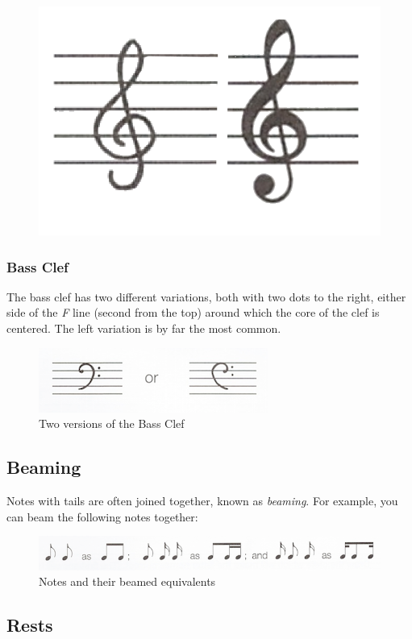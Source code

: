 \begin{figure}[h!]
  \includegraphics[width=0.3\linewidth]{gfx/basic/treble-clef.png}
  \centering
  \label{fig:TrebleClef}
\end{figure}

\subsubsection{Bass Clef}

The bass clef has two different variations, both with two dots to the right, either side of the \emph{F} line (second from the top) around which the core of the clef is centered. The left variation is by far the most common.

\begin{figure}[h!]
  \includegraphics[width=0.5\linewidth]{gfx/basic/bass-clef.png}
  \centering
  \caption{Two versions of the Bass Clef}
  \label{fig:BassClef}
\end{figure}

\subsection{Beaming}

Notes with tails are often joined together, known as \emph{beaming}. For example, you can beam the following notes together:

\begin{figure}[h!]
  \includegraphics[width=\linewidth]{gfx/basic/beaming.png}
  \centering
  \caption{Notes and their beamed equivalents}
  \label{fig:NotesBeamedEquiv}
\end{figure}


\subsection{Rests}


